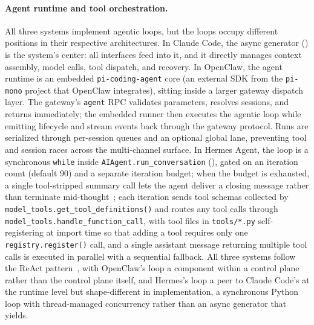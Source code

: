 \paragraph{Agent runtime and tool orchestration.}
All three systems implement agentic loops, but the loops occupy different positions in their respective architectures. In Claude Code, the  async generator () is the system's center: all interfaces feed into it, and it directly manages context assembly, model calls, tool dispatch, and recovery. In OpenClaw, the agent runtime is an embedded \texttt{pi-coding-agent} core (an external SDK from the \texttt{pi-mono} project that OpenClaw integrates), sitting inside a larger gateway dispatch layer. The gateway's \texttt{agent} RPC validates parameters, resolves sessions, and returns immediately; the embedded runner then executes the agentic loop while emitting lifecycle and stream events back through the gateway protocol. Runs are serialized through per-session queues and an optional global lane, preventing tool and session races across the multi-channel surface. In Hermes Agent, the loop is a synchronous \texttt{while} inside \texttt{AIAgent.run\_conversation} (), gated on an iteration count (default 90) and a separate iteration budget; when the budget is exhausted, a single tool-stripped summary call lets the agent deliver a closing message rather than terminate mid-thought~\tierB{}; each iteration sends tool schemas collected by \texttt{model\_tools.get\_tool\_definitions()} and routes any tool calls through \texttt{model\_tools.handle\_function\_call}, with tool files in \texttt{tools/*.py} self-registering at import time so that adding a tool requires only one \texttt{registry.register()} call, and a single assistant message returning multiple tool calls is executed in parallel with a sequential fallback. All three systems follow the ReAct pattern~\citep{yao2022react}, with OpenClaw's loop a component within a control plane rather than the control plane itself, and Hermes's loop a peer to Claude Code's at the runtime level but shape-different in implementation, a synchronous Python loop with thread-managed concurrency rather than an async generator that yields.

